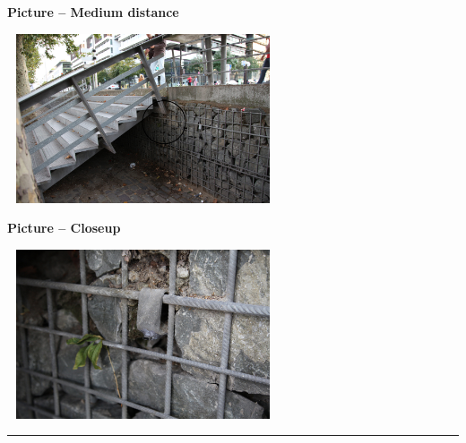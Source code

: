 \documentclass[11pt,twoside,a4paper]{article}
\begin{document}
\begin{minipage}[ht]{0.45\textwidth}
	\textbf{Picture -- Medium distance}
	\begin{center} \includegraphics[width=8.00cm, height=5.00cm]{img/781-871817.jpg} \end{center}
\end{minipage} \hfill \begin{minipage}[ht]{0.45\textwidth}
	\textbf{Picture -- Closeup}
	\begin{center} \includegraphics[width=8.00cm, height=5.00cm]{img/781-349845.jpg} \end{center}
\end{minipage}

\begin{center} \rule{0.75\textwidth}{0.01cm} \end{center}
\end{document}
